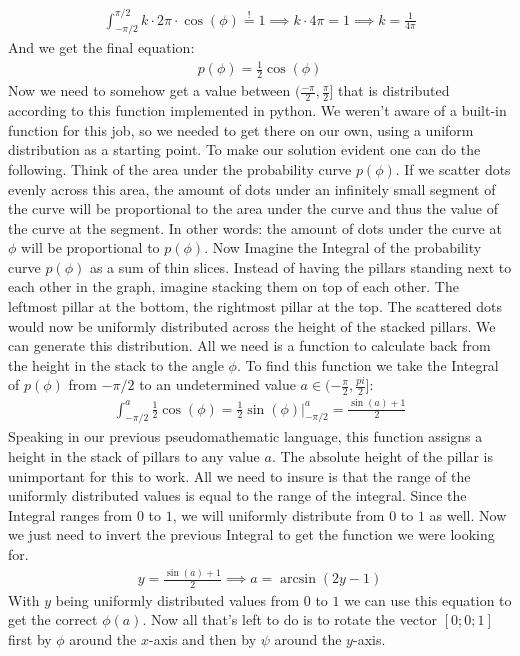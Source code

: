 \documentclass[12pt,a4paper,oneside,english]{article}
\begin{document}
\begin{align}
\int_{-\pi/2}^{\pi/2}k\cdot 2\pi \cdot \cos(\phi) \overset{!}{=} 1 \implies k \cdot 4\pi  = 1 \implies k = \frac{1}{4\pi}
\end{align}
And we get the final equation:
\begin{align}
p(\phi) = \frac{1}{2}\cos(\phi)
\end{align}
Now we need to somehow get a value between $(\frac{-\pi}{2}, \frac{\pi}{2}]$ that is distributed according to this function implemented in python. We weren’t aware of a built-in function for this job, so we needed to get there on our own, using a uniform distribution as a starting point. To make our solution evident one can do the following.
Think of the area under the probability curve $p(\phi)$. If we scatter dots evenly across this area, the amount of dots under an infinitely small segment of the curve will be proportional to the area under the curve and thus the value of the curve at the segment. In other words: the amount of dots under the curve at $\phi$ will be proportional to $p(\phi)$. Now Imagine the Integral of the probability curve $p(\phi)$ as a sum of thin slices. Instead of having the pillars standing next to each other in the graph, imagine stacking them on top of each other. The leftmost pillar at the bottom, the rightmost pillar at the top. The scattered dots would now be uniformly distributed across the height of the stacked pillars. We can generate this distribution. All we need is a function to calculate back from the height in the stack to the angle $\phi$.
To find this function we take the Integral of $p(\phi)$ from $-\pi/2$ to an undetermined value $a \in (-\frac{\pi}{2}, \frac{pi}{2}]$:
\begin{align}
\int_{-\pi/2}^{a}\frac{1}{2}\cos(\phi) = \frac{1}{2} \sin(\phi) \bigg|_{-\pi/2}^{a} = \frac{\sin(a)+1}{2}
\end{align}
Speaking in our previous pseudomathematic language, this function assigns a height in the stack of pillars to any value $a$. The absolute height of the pillar is unimportant for this to work. All we need to insure is that the range of the uniformly distributed values is equal to the range of the integral. Since the Integral ranges from $0$ to $1$, we will uniformly distribute from $0$ to $1$ as well. Now we just need to invert the previous Integral to get the function we were looking for.
\begin{align}
y = \frac{\sin(a)+1}{2} \implies a=\arcsin(2y-1)
\end{align}
With $y$ being uniformly distributed values from $0$ to $1$ we can use this equation to get the correct $\phi(a)$. Now all that’s left to do is to rotate the vector $[0;0;1]$ first by $\phi$ around the $x$-axis and then by $\psi$ around the $y$-axis.
\end{document}
